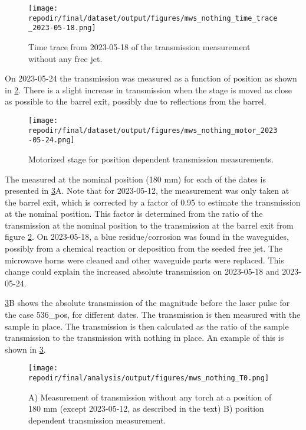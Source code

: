 \begin{figure}[]
\centering
\texttt{[image: \\repodir/final/dataset/output/figures/mws\_nothing\_time\_trace\_2023-05-18.png]}
\caption{Time trace from 2023-05-18 of the transmission measurement without any free jet.}
\label{fig:SI_MWS_nothing_time_trace}
\end{figure}

On 2023-05-24 the transmission was measured as a function of position as shown in \ref{fig:SI_MWS_nothing_motor}. There is a slight increase in transmission when the stage is moved as close as possible to the barrel exit, possibly due to reflections from the barrel.


\begin{figure}
\centering
\texttt{[image: \\repodir/final/dataset/output/figures/mws\_nothing\_motor\_2023-05-24.png]}
\caption{Motorized stage for position dependent transmission measurements.}
\label{fig:SI_MWS_nothing_motor}
\end{figure}


The  measured at the nominal position (180 mm) for each of the dates is presented in \ref{fig:SI_MWS_nothing_T0}A. Note that for 2023-05-12, the measurement was only taken at the barrel exit, which is corrected by a factor of 0.95 to estimate the transmission at the nominal position. This factor is determined from the ratio of the transmission at the nominal position to the transmission at the barrel exit from figure \ref{fig:SI_MWS_nothing_motor}. On 2023-05-18, a blue residue/corrosion was found in the waveguides, possibly from a chemical reaction or deposition from the seeded free jet. The microwave horns were cleaned and other waveguide parts were replaced. This change could explain the increased absolute transmission on 2023-05-18 and 2023-05-24.  

\ref{fig:SI_MWS_nothing_T0}B shows the absolute transmission of the magnitude before the laser pulse for the case 536\_pos, for different dates. The transmission is then measured with the sample in place. The transmission is then calculated as the ratio of the sample transmission to the transmission with nothing in place. An example of this is shown in \ref{fig:SI_MWS_nothing_T0}.  


\begin{figure}[]
\centering
\texttt{[image: \\repodir/final/analysis/output/figures/mws\_nothing\_T0.png]}
\caption{A) Measurement of transmission without any torch at a position of 180 mm (except 2023-05-12, as described in the text) B) position dependent transmission measurement.}
\label{fig:SI_MWS_nothing_T0}
\end{figure}

